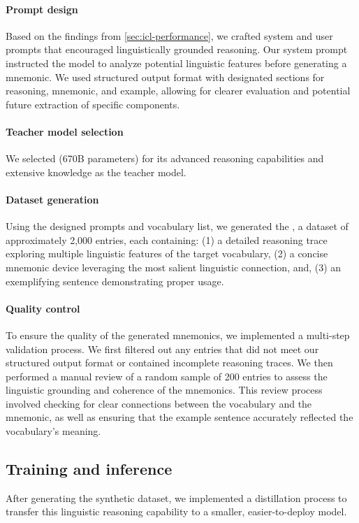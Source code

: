 \paragraph{Prompt design} Based on the findings from \cref{sec:icl-performance}, we crafted system and user prompts that encouraged linguistically grounded reasoning. Our system prompt instructed the model to analyze potential linguistic features before generating a mnemonic. We used structured output format with designated sections for reasoning, mnemonic, and example, allowing for clearer evaluation and potential future extraction of specific components.

\paragraph{Teacher model selection} We selected \teachermodel (670B parameters) \citep{DeepSeek-AIDEEPSEEKR12025} for its advanced reasoning capabilities and extensive knowledge as the teacher model.

\paragraph{Dataset generation} Using the designed prompts and vocabulary list, we generated the \links, a dataset of approximately 2,000 entries, each containing: (1) a detailed reasoning trace exploring multiple linguistic features of the target vocabulary, (2) a concise mnemonic device leveraging the most salient linguistic connection, and, (3) an exemplifying sentence demonstrating proper usage.

\paragraph{Quality control} To ensure the quality of the generated mnemonics, we implemented a multi-step validation process. We first filtered out any entries that did not meet our structured output format or contained incomplete reasoning traces. We then performed a manual review of a random sample of 200 entries to assess the linguistic grounding and coherence of the mnemonics. This review process involved checking for clear connections between the vocabulary and the mnemonic, as well as ensuring that the example sentence accurately reflected the vocabulary's meaning.

\subsection{Training and inference}
After generating the synthetic dataset, we implemented a distillation process to transfer this linguistic reasoning capability to a smaller, easier-to-deploy model.

